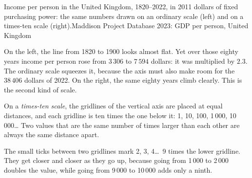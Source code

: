 \begin{omchart}{Income per person in the United Kingdom, 1820--2022, in 2011
dollars of fixed purchasing power: the same numbers drawn on an ordinary scale
(left) and on a times-ten scale (right).}{Maddison Project Database 2023: GDP per person, United Kingdom}
\end{omchart}

On the left, the line from 1820 to 1900 looks almost flat. Yet over those
eighty years income per person rose from $3\,306$ to $7\,594$ dollars: it was
multiplied by $2.3$. The ordinary scale squeezes it, because the axis must also
make room for the $38\,406$ dollars of 2022. On the right, the same eighty
years climb clearly. This is the second kind of scale.

\begin{definition}\label{def:g6:reading-economic-charts:times-ten-scale}
On a \emph{times-ten scale}, the gridlines of the
vertical axis are placed at equal distances, and each gridline is ten times
the one below it: 1, 10, 100, 1\,000, 10\,000\ldots{} Two values that are
the same number of times larger than each other are always the same distance
apart.
\end{definition}

The small ticks between two gridlines mark 2, 3, 4\ldots\ 9 times the lower
gridline. They get closer and closer as they go up, because going from 1\,000
to 2\,000 doubles the value, while going from 9\,000 to 10\,000 adds only a
ninth.

